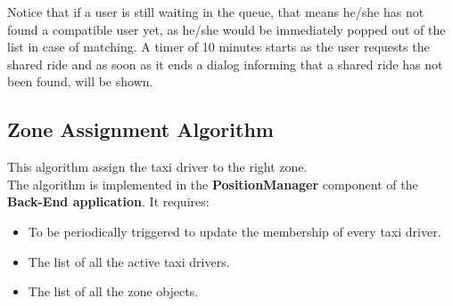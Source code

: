 Notice that if a user is still waiting in the queue, that means he/she has not found a compatible user yet, as he/she would be immediately popped out of the list in case of matching.
A timer of 10 minutes starts as the user requests the shared ride and as soon as it ends a dialog informing that a shared ride has not been found, will be shown.





\subsection{Zone Assignment Algorithm} %
\label{sub:third_algorithm}
This algorithm assign the taxi driver to the right zone.\\
The algorithm is implemented in the \textbf{PositionManager} component of the \textbf{Back-End application}.
It requires:
\begin{itemize}
	\item To be periodically triggered to update the membership of every taxi driver.
	\item The list of all the active taxi drivers.
	\item The list of all the zone objects.
\end{itemize}







